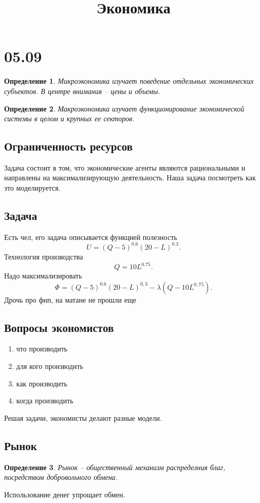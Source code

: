 \documentclass[14pt]{extarticle}
\title{Экономика}
\author{}
\date{}
\newtheorem{definition}{Определение}
\begin{document}
    \maketitle
    \section{05.09}
    \begin{definition}
        Микроэкономика изучает поведение отдельных экономических субъектов.
        В центре внимания -- цены и объемы.
    \end{definition}
    \begin{definition}
        Макроэкономика изучает функционирование экономической системы в целом и крупных ее секторов.
    \end{definition}
    \subsection{Ограниченность ресурсов}
    Задача состоит в том, что экономические агенты являются рациональными и направлены на максимализирующую деятельность. Наша задача посмотреть как это моделируется.
    \subsection{Задача}
    Есть чел, его задача описывается функцией полезность
    \[
    U = (Q  - 5)^{0.6} (20 - L)^{0.3}
    .\] 
    Технология производства
    \[
    Q = 10 L^{0.75}
    .\] 
    Надо максимализировать
    \[
    \Phi = (Q - 5)^{0.6} (20 - L)^{0,3} - \lambda (Q - 10 L^{0,75})
    .\] 
    Дрочь про фнп, на матане не прошли еще
    \subsection{Вопросы экономистов}
    \begin{enumerate}
        \item что производить
        \item для кого производить
        \item как производить
        \item когда производить
    \end{enumerate}
    Решая задачи, экономисты делают разные модели.
    \subsection{Рынок}
    \begin{definition}
        Рынок -- общественный механизм распределния благ, посредством добровольного обмена.
    \end{definition}
    Использование денег упрощает обмен.
\end{document}
